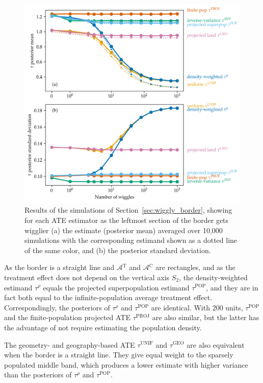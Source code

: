 \documentclass[letter,12pt]{article}
\newcommand{\area}{\mathcal{A}}
\newcommand{\treat}{\mathrm{T}}
\newcommand{\ctrol}{\mathrm{C}}
\newcommand{\treatarea}{\area{}^{\treat}}
\newcommand{\ctrolarea}{\area{}^{\ctrol}}
\newcommand{\unifavg}{\tau^{\mathrm{UNIF}}}
\newcommand{\taurho}{\tau^{\rho}}
\newcommand{\tauproj}{\tau^{\mathrm{PROJ}}}
\newcommand{\taugeo}{\tau^{\mathrm{GEO}}}
\newcommand{\taupop}{\tau^{\mathrm{POP}}}
\begin{document}
\begin{figure}[tbp]
\centering
\includegraphics[height=0.4\textheight]{../figures/wiggly_boundaries_posteriors.png}
\caption{\label{fig:wiggly_boundaries_posteriors} Results of the simulations of Section~\ref{sec:wiggly_border}, showing for each ATE estimator as the leftmost section of the border gets wigglier (a) the estimate (posterior mean) averaged over 10,000 simulations with the corresponding estimand shown as a dotted line of the same color, and (b) the posterior standard deviation.}
\end{figure}
    
As the border is a straight line and \(\treatarea\) and \(\ctrolarea\) are rectangles,
and as the treatment effect does not depend on the vertical axis \(S_2\),
the density-weighted estimand \(\taurho\) equals the projected superpopulation estimand \(\taupop\),
and they are in fact both equal to the infinite-population average treatment effect.
Correspondingly, the posteriors of \(\taurho\) and \(\taupop\) are identical.
With 200 units, \(\taupop\) and the finite-population projected ATE \(\tauproj\) are also similar, but the latter has the advantage of not require estimating the population density.

The geometry- and geography-based ATE \(\unifavg\) and \(\taugeo\) are also equivalent when the border is a straight line.
They give equal weight to the sparsely populated middle band, which produces a lower estimate with higher variance than the posteriors of \(\taurho\) and \(\taupop\).
\end{document}
